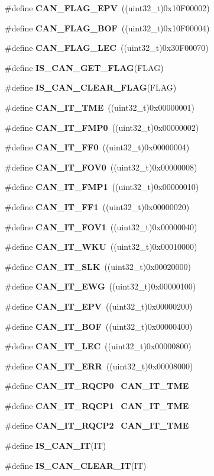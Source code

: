 \begin{DoxyCompactItemize}
\#define \textbf{ C\+A\+N\+\_\+\+F\+L\+A\+G\+\_\+\+E\+PV}~((uint32\+\_\+t)0x10\+F00002)
\item 
\#define \textbf{ C\+A\+N\+\_\+\+F\+L\+A\+G\+\_\+\+B\+OF}~((uint32\+\_\+t)0x10\+F00004)
\item 
\#define \textbf{ C\+A\+N\+\_\+\+F\+L\+A\+G\+\_\+\+L\+EC}~((uint32\+\_\+t)0x30\+F00070)
\item 
\#define \textbf{ I\+S\+\_\+\+C\+A\+N\+\_\+\+G\+E\+T\+\_\+\+F\+L\+AG}(F\+L\+AG)
\item 
\#define \textbf{ I\+S\+\_\+\+C\+A\+N\+\_\+\+C\+L\+E\+A\+R\+\_\+\+F\+L\+AG}(F\+L\+AG)
\item 
\#define \textbf{ C\+A\+N\+\_\+\+I\+T\+\_\+\+T\+ME}~((uint32\+\_\+t)0x00000001)
\item 
\#define \textbf{ C\+A\+N\+\_\+\+I\+T\+\_\+\+F\+M\+P0}~((uint32\+\_\+t)0x00000002)
\item 
\#define \textbf{ C\+A\+N\+\_\+\+I\+T\+\_\+\+F\+F0}~((uint32\+\_\+t)0x00000004)
\item 
\#define \textbf{ C\+A\+N\+\_\+\+I\+T\+\_\+\+F\+O\+V0}~((uint32\+\_\+t)0x00000008)
\item 
\#define \textbf{ C\+A\+N\+\_\+\+I\+T\+\_\+\+F\+M\+P1}~((uint32\+\_\+t)0x00000010)
\item 
\#define \textbf{ C\+A\+N\+\_\+\+I\+T\+\_\+\+F\+F1}~((uint32\+\_\+t)0x00000020)
\item 
\#define \textbf{ C\+A\+N\+\_\+\+I\+T\+\_\+\+F\+O\+V1}~((uint32\+\_\+t)0x00000040)
\item 
\#define \textbf{ C\+A\+N\+\_\+\+I\+T\+\_\+\+W\+KU}~((uint32\+\_\+t)0x00010000)
\item 
\#define \textbf{ C\+A\+N\+\_\+\+I\+T\+\_\+\+S\+LK}~((uint32\+\_\+t)0x00020000)
\item 
\#define \textbf{ C\+A\+N\+\_\+\+I\+T\+\_\+\+E\+WG}~((uint32\+\_\+t)0x00000100)
\item 
\#define \textbf{ C\+A\+N\+\_\+\+I\+T\+\_\+\+E\+PV}~((uint32\+\_\+t)0x00000200)
\item 
\#define \textbf{ C\+A\+N\+\_\+\+I\+T\+\_\+\+B\+OF}~((uint32\+\_\+t)0x00000400)
\item 
\#define \textbf{ C\+A\+N\+\_\+\+I\+T\+\_\+\+L\+EC}~((uint32\+\_\+t)0x00000800)
\item 
\#define \textbf{ C\+A\+N\+\_\+\+I\+T\+\_\+\+E\+RR}~((uint32\+\_\+t)0x00008000)
\item 
\#define \textbf{ C\+A\+N\+\_\+\+I\+T\+\_\+\+R\+Q\+C\+P0}~\textbf{ C\+A\+N\+\_\+\+I\+T\+\_\+\+T\+ME}
\item 
\#define \textbf{ C\+A\+N\+\_\+\+I\+T\+\_\+\+R\+Q\+C\+P1}~\textbf{ C\+A\+N\+\_\+\+I\+T\+\_\+\+T\+ME}
\item 
\#define \textbf{ C\+A\+N\+\_\+\+I\+T\+\_\+\+R\+Q\+C\+P2}~\textbf{ C\+A\+N\+\_\+\+I\+T\+\_\+\+T\+ME}
\item 
\#define \textbf{ I\+S\+\_\+\+C\+A\+N\+\_\+\+IT}(IT)
\item 
\#define \textbf{ I\+S\+\_\+\+C\+A\+N\+\_\+\+C\+L\+E\+A\+R\+\_\+\+IT}(IT)
\end{DoxyCompactItemize}
